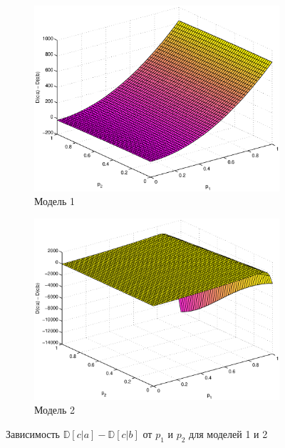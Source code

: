 \documentclass[12pt,a4paper,oneside,fleqn,leqno]{article}
\begin{document}
			\begin{figure}[H]
				\begin{subfigure}[b]{0.5\textwidth}
					\centering
					\includegraphics[width=1.0\textwidth]{variance_1.eps}
				\caption{Модель 1}
				\label{fig:variance_1}
				\end{subfigure}
				\begin{subfigure}[b]{0.5\textwidth}
					\centering
					\includegraphics[width=1.0\textwidth]{variance_2.eps}
					\caption{Модель 2}
					\label{fig:variance_2}
				\end{subfigure}
				\captionsetup{justification=centering}
				\caption{Зависимость $\mathbb{D}[c|a] - \mathbb{D}[c|b]$ от $p_1$ и $p_2$ для моделей 1 и 2}
				\label{fig:distr_c_d}
			\end{figure}\par
\end{document}
